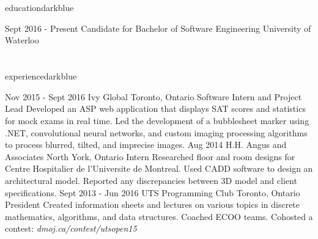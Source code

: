 \documentclass{resume}
\begin{document}
	\begin{main}
		\vspace{5pt}%
		\section{\faBook}{education}{darkblue}
			\begin{entrylist}
				\rightentry%
				{Sept 2016 - Present}%
				{Candidate for Bachelor of Software Engineering}%
				{University of Waterloo}%
				{}{}
			\end{entrylist}
		\vspace{-10pt}%
		\section{\faBriefcase}{experience}{darkblue}
			\begin{entrylist}
				\rightentry%
					{Nov 2015 - Sept 2016}%
					{Ivy Global}%
					{Toronto, Ontario}%
					{Software Intern and Project Lead}%
					{Developed an ASP web application that displays SAT scores and statistics for mock exams in real time. Led the development of a bubblesheet marker using .NET, convolutional neural networks, and custom imaging processing algorithms to process blurred, tilted, and imprecise images.}
				\rightentry%
					{Aug 2014}%
					{H.H. Angus and Associates}%
					{North York, Ontario}%
					{Intern}%
					{Researched floor and room designs for Centre Hospitalier de l'Universite de Montreal. Used CADD software to design an architectural model. Reported any discrepancies between 3D model and client specifications.}
				\rightentry%
					{Sept 2013 - Jun 2016}%
					{UTS Programming Club}%
					{Toronto, Ontario}%
					{President}%
					{Created information sheets and lectures on various topics in discrete mathematics, algorithms, and data structures. Coached ECOO teams. Cohosted a contest: \emph{dmoj.ca/contest/utsopen15}}
			\end{entrylist}

\end{main}
\end{document}
